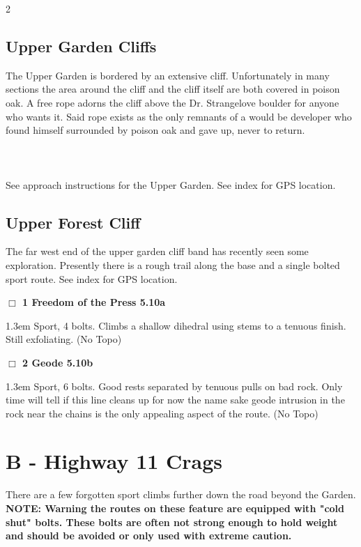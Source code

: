 \begin{multicols}{2}
\subsection*{Upper Garden Cliffs}\label{bf:Upper Garden Cliffs}
The Upper Garden is bordered by an extensive cliff. Unfortunately in many sections the area around the cliff and the cliff itself are both covered in poison oak. A free rope adorns the cliff above the Dr. Strangelove boulder for anyone who wants it. Said rope exists as the only remnants of a would be developer who found himself surrounded by poison oak and gave up, never to return.\\\\
\\\\
See approach instructions for the Upper Garden. See index for GPS location.\\
\needspace{10em}
\subsection*{Upper Forest Cliff}\label{bf:Upper Forest Cliff}
The far west end of the upper garden cliff band has recently seen some exploration. Presently there is a rough trail along the base and a single bolted sport route. See index for GPS location.\\
\needspace{2em}
\label{rt:Freedom of the Press}
\colorbox{RoyalBlue!20}{
\parbox{0.95\linewidth}{
\hspace{-1ex}\textbf{$\Box$
1 Freedom of the Press 5.10a  
}}}
\begin{adjustwidth}{1.3em}{}			
Sport, 4 bolts. Climbs a shallow dihedral using stems to a tenuous finish. Still exfoliating.
  (No Topo)
\end{adjustwidth}
\needspace{2em}
\label{rt:Geode}
\colorbox{RoyalBlue!20}{
\parbox{0.95\linewidth}{
\hspace{-1ex}\textbf{$\Box$
2 Geode 5.10b  
}}}
\begin{adjustwidth}{1.3em}{}			
Sport, 6 bolts. Good rests separated by tenuous pulls on bad rock. Only time will tell if this line cleans up for now the name sake geode intrusion in the rock near the chains is the only appealing aspect of the route.
  (No Topo)
\end{adjustwidth}
\newpage
\section{B - Highway 11 Crags}\label{sa:Highway 11 Crags}
There are a few forgotten sport climbs further down the road beyond the Garden.\\
\textbf{NOTE: Warning the routes on these feature are equipped with "cold shut" bolts. These bolts are often not strong enough to hold weight and should be avoided or only used with extreme caution.}\\
\needspace{10em}

\end{multicols}
